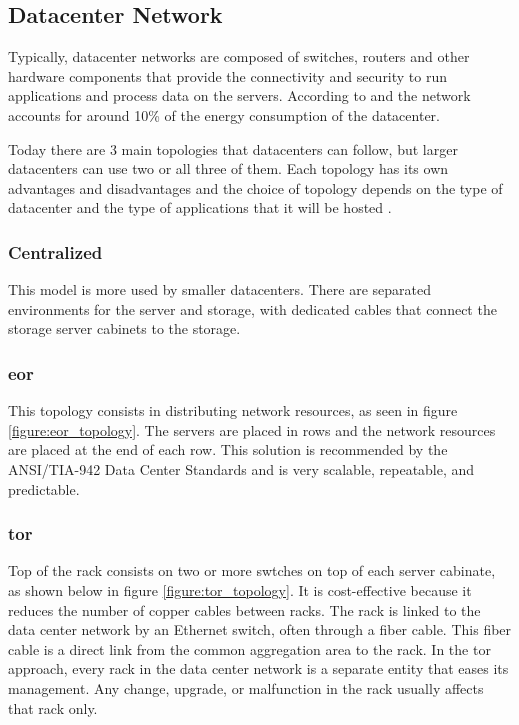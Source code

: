 \subsection{Datacenter Network}

Typically, datacenter networks are composed of switches, routers and other hardware components that provide the connectivity and security to run applications and process data on the servers. 
According to \citet{Cheung} and \citet{Miyuru} the network accounts for around 10\% of the energy consumption of the datacenter. 

Today there are 3 main topologies that datacenters can follow, but larger datacenters can use two or all three of them. Each topology has its own advantages and disadvantages and the choice of topology depends on the type of datacenter and the type of applications that it will be hosted \citet{commScope}.

\subsubsection{Centralized}

This model is more used by smaller datacenters. There are separated environments for the server and storage, with dedicated  cables that connect the storage server cabinets to the storage.  

\subsubsection{\ac{eor}}

This topology consists in distributing network resources, as seen in figure \ref{figure:eor_topology}. The servers are placed in rows and the network resources are placed at the end of each row. This solution is recommended by the  ANSI/TIA-942 Data Center Standards \cite{ANSI/TIA-942} and is very scalable, repeatable, and predictable.

\subsubsection{\ac{tor}}

Top of the rack consists on two or more swtches on top of each server cabinate, as shown below in figure \ref{figure:tor_topology}. It is cost-effective because it reduces the number of copper cables between racks. The rack is linked to the data center network by an Ethernet switch, often through a fiber cable. This fiber cable is a direct link from the common aggregation area to the rack.
In the \ac{tor} approach, every rack in the data center network is a separate entity that eases its management. Any change, upgrade, or malfunction in the rack usually affects that rack only.

